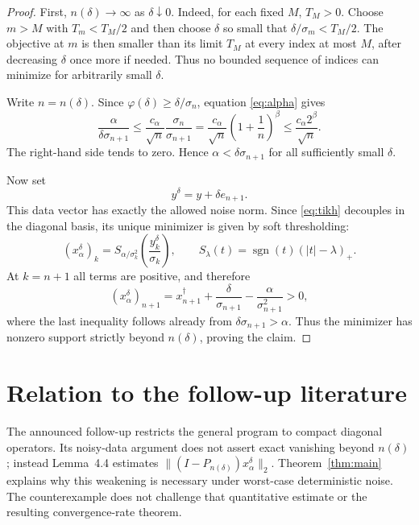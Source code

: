 \documentclass[11pt]{article}
\begin{document}
\begin{proof}
First, $n(\delta)\to\infty$ as $\delta\downarrow0$.  Indeed, for each fixed
$M$, $T_M>0$.  Choose $m>M$ with $T_m<T_M/2$ and then choose $\delta$ so small
that $\delta/\sigma_m<T_M/2$.  The objective at $m$ is then smaller than its
limit $T_M$ at every index at most $M$, after decreasing $\delta$ once more if
needed.  Thus no bounded sequence of indices can minimize for arbitrarily small
$\delta$.

Write $n=n(\delta)$.  Since
$\varphi(\delta)\geq\delta/\sigma_n$, equation \eqref{eq:alpha} gives
\begin{equation}\label{eq:key}
  \frac{\alpha}{\delta\sigma_{n+1}}
  \leq
  \frac{c_\alpha}{\sqrt n}\frac{\sigma_n}{\sigma_{n+1}}
  =\frac{c_\alpha}{\sqrt n}\left(1+\frac1n\right)^\beta
  \leq \frac{c_\alpha 2^\beta}{\sqrt n}.
\end{equation}
The right-hand side tends to zero.  Hence
$\alpha<\delta\sigma_{n+1}$ for all sufficiently small $\delta$.

Now set
\[
  y^\delta=y+\delta e_{n+1}.
\]
This data vector has exactly the allowed noise norm.  Since \eqref{eq:tikh}
decouples in the diagonal basis, its unique minimizer is given by soft
thresholding:
\[
  (x_\alpha^\delta)_k
  =S_{\alpha/\sigma_k^2}
    \left(\frac{y_k^\delta}{\sigma_k}\right),
  \qquad
  S_\lambda(t)=\operatorname{sgn}(t)(|t|-\lambda)_+.
\]
At $k=n+1$ all terms are positive, and therefore
\[
  (x_\alpha^\delta)_{n+1}
  =x_{n+1}^\dagger+\frac{\delta}{\sigma_{n+1}}
      -\frac{\alpha}{\sigma_{n+1}^2}>0,
\]
where the last inequality follows already from
$\delta\sigma_{n+1}>\alpha$.  Thus the minimizer has nonzero support strictly
beyond $n(\delta)$, proving the claim.
\end{proof}

\section{Relation to the follow-up literature}

The announced follow-up \cite{GH2019} restricts the general program to compact
diagonal operators.  Its noisy-data argument does not assert exact vanishing
beyond $n(\delta)$; instead Lemma~4.4 estimates
$\|(I-P_{n(\delta)})x_\alpha^\delta\|_2$.  Theorem~\ref{thm:main} explains why
this weakening is necessary under worst-case deterministic noise.  The
counterexample does not challenge that quantitative estimate or the resulting
convergence-rate theorem.
\end{document}
